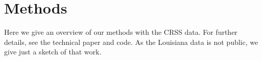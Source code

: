 \section{Methods}

Here we give an overview of our methods with the CRSS data.  For further details, see the technical paper and code.  As the Louisiana data is not public, we give just a sketch of that work.  